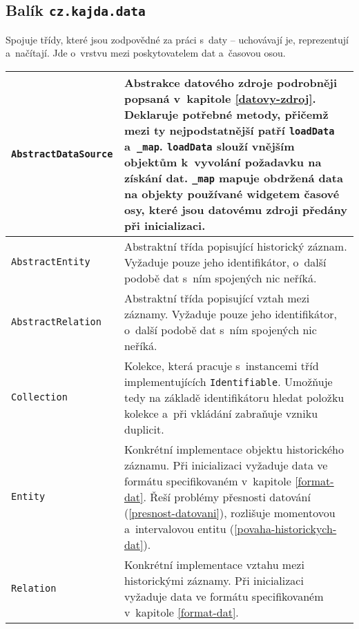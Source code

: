 			\subsection{Balík {\tt cz.kajda.data}}
				Spojuje třídy, které jsou zodpovědné za práci s~daty -- uchovávají je, reprezentují a~načítají. Jde o~vrstvu mezi poskytovatelem dat a~časovou osou.
				\begin{longtable}{|p{}p{}|}
					\hline
					\tt AbstractDataSource & Abstrakce datového zdroje podrobněji popsaná v~kapitole \ref{datovy-zdroj}. Deklaruje potřebné metody, přičemž mezi ty nejpodstatnější patří {\tt loadData} a~{\tt \_map}. {\tt loadData} slouží vnějším objektům k~vyvolání požadavku na získání dat. {\tt \_map} mapuje obdržená data na objekty používané widgetem časové osy, které jsou datovému zdroji předány při inicializaci.\\
					\hline
					{\tt AbstractEntity} & Abstraktní třída popisující historický záznam. Vyžaduje pouze jeho identifikátor, o~další podobě dat s~ním spojených nic neříká. \\
					\hline
					{\tt AbstractRelation} & Abstraktní třída popisující vztah mezi záznamy. Vyžaduje pouze jeho identifikátor, o~další podobě dat s~ním spojených nic neříká. \\
					\hline
					{\tt Collection} & Kolekce, která pracuje s~instancemi tříd implementujících {\tt Identifiable}. Umožňuje tedy na základě identifikátoru hledat položku kolekce a~při vkládání zabraňuje vzniku duplicit.\\
					\hline
					{\tt Entity} & Konkrétní implementace objektu historického záznamu. Při inicializaci vyžaduje data ve formátu specifikovaném v~kapitole \ref{format-dat}. Řeší problémy přesnosti datování (\ref{presnost-datovani}), rozlišuje momentovou a~intervalovou entitu (\ref{povaha-historickych-dat}). \\
					\hline
					{\tt Relation} & Konkrétní implementace vztahu mezi historickými záznamy. Při inicializaci vyžaduje data ve formátu specifikovaném v~kapitole \ref{format-dat}. \\
					\hline
				\end{longtable}
